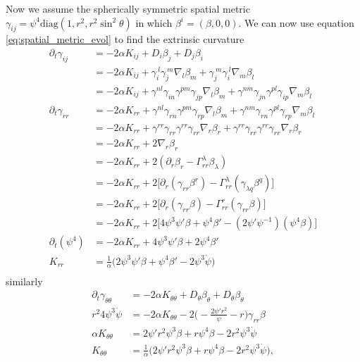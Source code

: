 \documentclass[12pt]{article}
\numberwithin{equation}{section}
\begin{document}
Now we assume the spherically symmetric spatial metric $\gamma_{ij} = \psi^4 \mathrm{diag}(1, r^2, r^2 \sin^2 \theta)$ in which $\beta^i = (\beta, 0, 0)$.  We can now use equation \ref{eq:spatial_metric_evol} to find the extrinsic curvature
\begin{equation}
\begin{aligned}
\partial_t \gamma_{ij} &= -2 \alpha K_{ij} + D_i \beta_j + D_j \beta_i \\
&= -2 \alpha K_{ij} + \gamma_{i}^{~l} \gamma_{j}^{~m} \nabla_l \beta_m + \gamma_j^{~m} \gamma_i^{~l} \nabla_m \beta_l \\
&= -2 \alpha K_{ij} + \gamma^{n l} \gamma_{i n} \gamma^{p m} \gamma_{j p} \nabla_l \beta_m + \gamma^{n m} \gamma_{j n} \gamma^{p l} \gamma_{i p} \nabla_m \beta_l \\
\partial_t \gamma_{r r} &= -2 \alpha K_{rr} + \gamma^{n l} \gamma_{r n} \gamma^{p m} \gamma_{r p} \nabla_l \beta_m + \gamma^{n m} \gamma_{r n} \gamma^{p l} \gamma_{r p} \nabla_m \beta_l \\
&= -2 \alpha K_{rr} + \gamma^{r r} \gamma_{r r} \gamma^{r r} \gamma_{r r} \nabla_r \beta_r + \gamma^{r r} \gamma_{r r} \gamma^{r r} \gamma_{r r} \nabla_r \beta_r \\
&= -2 \alpha K_{rr} + 2 \nabla_r \beta_r \\
&= -2 \alpha K_{rr} + 2 (\partial_r \beta_r - \Gamma^{\lambda}_{rr} \beta_\lambda) \\
&= -2 \alpha K_{rr} + 2 \Big[ \partial_r (\gamma_{rr} \beta^r) - \Gamma^{\lambda}_{rr} (\gamma_{\lambda q} \beta^{q}) \Big] \\
&= -2 \alpha K_{rr} + 2 \Big[ \partial_r (\gamma_{rr} \beta) - \Gamma^{r}_{rr} (\gamma_{r r} \beta) \Big] \\
&= -2 \alpha K_{rr} + 2 \Big[ 4 \psi^3 \psi' \beta + \psi^4 \beta' - (2\psi' \psi^{-1}) (\psi^4 \beta) \Big] \\
\partial_t (\psi^4) &= -2 \alpha K_{rr} + 4 \psi^3 \psi' \beta + 2 \psi^4 \beta' \\
K_{rr} &= \frac{1}{\alpha} \Big( 2 \psi^3 \psi' \beta + \psi^4 \beta' - 2 \psi^3 \dot{\psi} \Big) \\
\end{aligned}
\end{equation}
similarly
\begin{equation}
\begin{aligned}
\partial_t \gamma_{\theta \theta} &= -2 \alpha K_{\theta \theta} + D_\theta \beta_\theta + D_\theta \beta_\theta \\
r^2 4 \psi^3 \dot{\psi} &= -2 \alpha K_{\theta \theta} - 2 \Big( - \frac{2 \psi' r^2}{\psi} - r \Big) \gamma_{rr} \beta \\
\alpha K_{\theta \theta} &= 2 \psi' r^2 \psi^3 \beta + r \psi^4 \beta - 2 r^2 \psi^3 \dot{\psi}\\
K_{\theta \theta} &= \frac{1}{\alpha} \Big( 2 \psi' r^2 \psi^3 \beta + r \psi^4 \beta - 2 r^2 \psi^3 \dot{\psi} \Big), \\
\end{aligned}
\end{equation}
\end{document}
